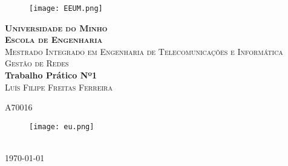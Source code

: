\documentclass[../momento_1.tex]{subfiles}
\begin{document}
\begin{titlepage}

\center %
 
\begin{figure}[h]
\centering
\texttt{[image: EEUM.png]} %
\end{figure}

\textsc{\Large \textbf{Universidade do Minho}}\\
\textsc{\large \textbf{Escola de Engenharia}}\\[2cm] %
\textsc{\small Mestrado Integrado em Engenharia de Telecomunicações e Informática}\\[0.5cm] %
\textsc{\normalsize Gestão de Redes}\\[4cm] %


{\huge \bfseries Trabalho Prático Nº1} \\[2cm] %


\textsc{Luís Filipe Freitas Ferreira}\par
\textsc{A70016}
\begin{figure}[h]
\centering
\texttt{[image: eu.png]} %
\end{figure}
\\[4cm] 

{\large \today}\\%



\vfill %

\end{titlepage}
\end{document}
